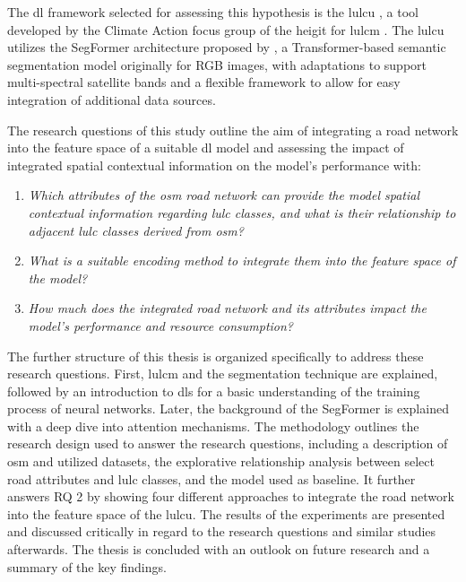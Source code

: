 The \gls{dl} framework selected for assessing this hypothesis is the \gls{lulcu} \autocite{HeiGIT2024a}, a tool developed by the Climate Action focus group of the \gls{heigit} for \gls{lulcm} \autocite{HeiGIT2024}. The \gls{lulcu} utilizes the SegFormer architecture proposed by \textcite{Xie.Wang.ea2021}, a Transformer-based semantic segmentation model originally for RGB images, with adaptations to support multi-spectral satellite bands and a flexible framework to allow for easy integration of additional data sources.

The research questions of this study outline the aim of integrating a road network into the feature space of a suitable \gls{dl} model and assessing the impact of integrated spatial contextual information on the model's performance with:\pagebreak

\begin{enumerate}[label={RQ \arabic*:}]
    \item \emph{Which attributes of the \gls{osm} road network can provide the model spatial contextual information regarding \gls{lulc} classes, and what is their relationship to adjacent \gls{lulc} classes derived from \gls{osm}?} 
    \item \emph{What is a suitable encoding method to integrate them into the feature space of the model?}
    \item \emph{How much does the integrated road network and its attributes impact the model's performance and resource consumption?}
\end{enumerate}

The further structure of this thesis is organized specifically to address these research questions. First, \gls{lulcm} and the segmentation technique are explained, followed by an introduction to \glspl{dl} for a basic understanding of the training process of neural networks. Later, the background of the SegFormer is explained with a deep dive into attention mechanisms. The methodology outlines the research design used to answer the research questions, including a description of \gls{osm} and utilized datasets, the explorative relationship analysis between select road attributes and \gls{lulc} classes, and the model used as baseline. It further answers RQ 2 by showing four different approaches to integrate the road network into the feature space of the \gls{lulcu}. The results of the experiments are presented and discussed critically in regard to the research questions and similar studies afterwards. The thesis is concluded with an outlook on future research and a summary of the key findings.

